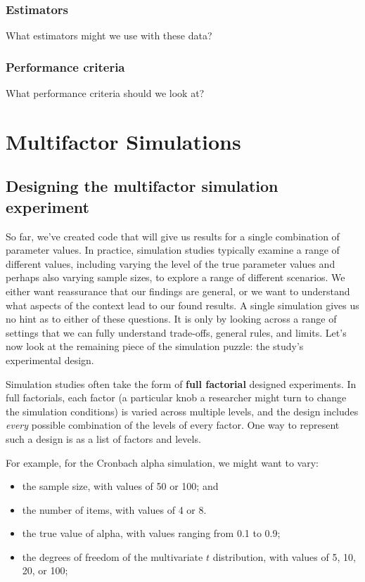 \documentclass[
]{book}
\providecommand{\tightlist}{%
  \setlength{\itemsep}{0pt}\setlength{\parskip}{0pt}}
\begin{document}
\section{Estimators}\label{estimators}

What estimators might we use with these data?

\section{Performance criteria}\label{performance-criteria-1}

What performance criteria should we look at?

\part{Multifactor Simulations}\label{part-multifactor-simulations}

\chapter{Designing the multifactor simulation experiment}\label{exp-design}

So far, we've created code that will give us results for a single combination of parameter values.
In practice, simulation studies typically examine a range of different values, including varying the level of the true parameter values and perhaps also varying sample sizes, to explore a range of different scenarios.
We either want reassurance that our findings are general, or we want to understand what aspects of the context lead to our found results.
A single simulation gives us no hint as to either of these questions.
It is only by looking across a range of settings that we can fully understand trade-offs, general rules, and limits.
Let's now look at the remaining piece of the simulation puzzle: the study's experimental design.

Simulation studies often take the form of \textbf{full factorial} designed experiments. In full factorials, each factor (a particular knob a researcher might turn to change the simulation conditions) is varied across multiple levels, and the design includes \emph{every} possible combination of the levels of every factor. One way to represent such a design is as a list of factors and levels.

For example, for the Cronbach alpha simulation, we might want to vary:

\begin{itemize}
\tightlist
\item
  the sample size, with values of 50 or 100; and
\item
  the number of items, with values of 4 or 8.
\item
  the true value of alpha, with values ranging from 0.1 to 0.9;
\item
  the degrees of freedom of the multivariate \(t\) distribution, with values of 5, 10, 20, or 100;
\end{itemize}
\end{document}
